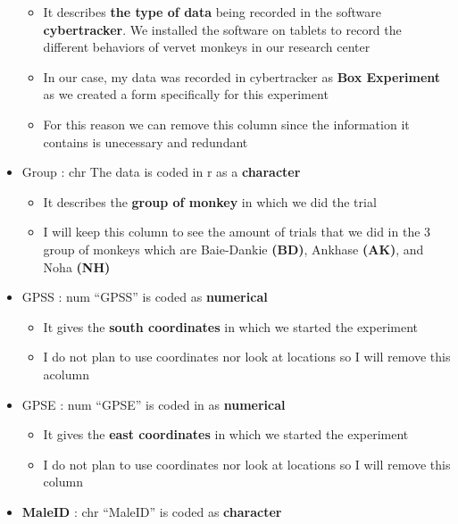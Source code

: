\documentclass[
]{article}
\providecommand{\tightlist}{%
  \setlength{\itemsep}{0pt}\setlength{\parskip}{0pt}}
\begin{document}
\begin{itemize}
  \begin{itemize}
  \tightlist
  \item
    It describes \textbf{the type of data} being recorded in the
    software \textbf{cybertracker}. We installed the software on tablets
    to record the different behaviors of vervet monkeys in our research
    center
  \item
    In our case, my data was recorded in cybertracker as \textbf{Box
    Experiment} as we created a form specifically for this experiment
  \item
    For this reason we can remove this column since the information it
    contains is unecessary and redundant
  \end{itemize}
\item
  Group : chr The data is coded in r as a \textbf{character}

  \begin{itemize}
  \tightlist
  \item
    It describes the \textbf{group of monkey} in which we did the trial
  \item
    I will keep this column to see the amount of trials that we did in
    the 3 group of monkeys which are Baie-Dankie \textbf{(BD)}, Ankhase
    \textbf{(AK)}, and Noha \textbf{(NH)}
  \end{itemize}
\item
  GPSS : num ``GPSS'' is coded as \textbf{numerical}

  \begin{itemize}
  \tightlist
  \item
    It gives the \textbf{south coordinates} in which we started the
    experiment
  \item
    I do not plan to use coordinates nor look at locations so I will
    remove this acolumn
  \end{itemize}
\item
  GPSE : num ``GPSE'' is coded in as \textbf{numerical}

  \begin{itemize}
  \tightlist
  \item
    It gives the \textbf{east coordinates} in which we started the
    experiment
  \item
    I do not plan to use coordinates nor look at locations so I will
    remove this column
  \end{itemize}
\item
  \textbf{MaleID} : chr ``MaleID'' is coded as \textbf{character}


\end{itemize}
\end{document}

